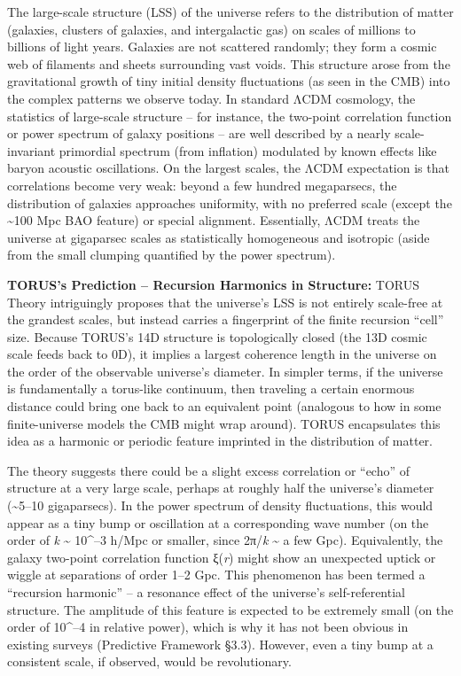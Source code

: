\documentclass[]{article}
\begin{document}
The large-scale structure (LSS) of the universe refers to the
distribution of matter (galaxies, clusters of galaxies, and
intergalactic gas) on scales of millions to billions of light years.
Galaxies are not scattered randomly; they form a cosmic web of filaments
and sheets surrounding vast voids. This structure arose from the
gravitational growth of tiny initial density fluctuations (as seen in
the CMB) into the complex patterns we observe today. In standard ΛCDM
cosmology, the statistics of large-scale structure -- for instance, the
two-point correlation function or power spectrum of galaxy positions --
are well described by a nearly scale-invariant primordial spectrum (from
inflation) modulated by known effects like baryon acoustic oscillations.
On the largest scales, the ΛCDM expectation is that correlations become
very weak: beyond a few hundred megaparsecs, the distribution of
galaxies approaches uniformity, with no preferred scale (except the
\textasciitilde{}100 Mpc BAO feature) or special alignment. Essentially,
ΛCDM treats the universe at gigaparsec scales as statistically
homogeneous and isotropic (aside from the small clumping quantified by
the power spectrum).

\textbf{TORUS's Prediction -- Recursion Harmonics in Structure:} TORUS
Theory intriguingly proposes that the universe's LSS is not entirely
scale-free at the grandest scales, but instead carries a fingerprint of
the finite recursion ``cell'' size. Because TORUS's 14D structure is
topologically closed (the 13D cosmic scale feeds back to 0D), it implies
a largest coherence length in the universe on the order of the
observable universe's diameter. In simpler terms, if the universe is
fundamentally a torus-like continuum, then traveling a certain enormous
distance could bring one back to an equivalent point (analogous to how
in some finite-universe models the CMB might wrap around). TORUS
encapsulates this idea as a harmonic or periodic feature imprinted in
the distribution of matter.

The theory suggests there could be a slight excess correlation or
``echo'' of structure at a very large scale, perhaps at roughly half the
universe's diameter (\textasciitilde{}5--10 gigaparsecs). In the power
spectrum of density fluctuations, this would appear as a tiny bump or
oscillation at a corresponding wave number (on the order of \emph{k}
\textasciitilde{} 10\^{}--3 h/Mpc or smaller, since 2π/\emph{k}
\textasciitilde{} a few Gpc). Equivalently, the galaxy two-point
correlation function ξ(\emph{r}) might show an unexpected uptick or
wiggle at separations of order 1--2 Gpc. This phenomenon has been termed
a ``recursion harmonic'' -- a resonance effect of the universe's
self-referential structure. The amplitude of this feature is expected to
be extremely small (on the order of 10\^{}--4 in relative power), which
is why it has not been obvious in existing surveys (Predictive Framework
§3.3). However, even a tiny bump at a consistent scale, if observed,
would be revolutionary.
\end{document}
